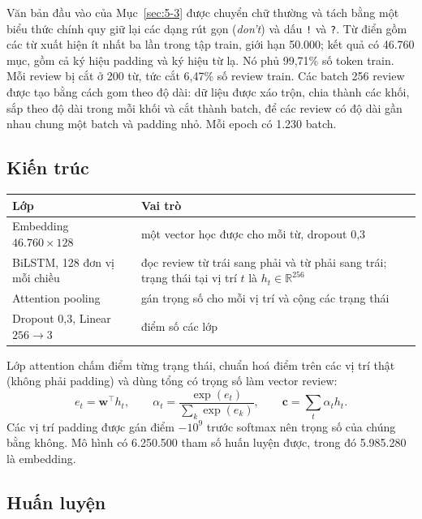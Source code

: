 Văn bản đầu vào của Mục~\ref{sec:5-3} được chuyển chữ thường và tách bằng một biểu thức chính quy giữ lại các dạng rút gọn (\emph{don't}) và dấu \texttt{!} và \texttt{?}. Từ điển gồm các từ xuất hiện ít nhất ba lần trong tập train, giới hạn 50.000; kết quả có 46.760 mục, gồm cả ký hiệu padding và ký hiệu từ lạ. Nó phủ 99,71\% số token train. Mỗi review bị cắt ở 200 từ, tức cắt 6,47\% số review train. Các batch 256 review được tạo bằng cách gom theo độ dài: dữ liệu được xáo trộn, chia thành các khối, sắp theo độ dài trong mỗi khối và cắt thành batch, để các review có độ dài gần nhau chung một batch và padding nhỏ. Mỗi epoch có 1.230 batch.

\subsection*{Kiến trúc}

\begin{center}
\begin{tabular}{@{}p{3.6cm}p{10.4cm}@{}}
    \toprule
    Lớp & Vai trò \\
    \midrule
    Embedding $46.760\times128$ & một vector học được cho mỗi từ, dropout 0,3 \\
    BiLSTM, 128 đơn vị mỗi chiều & đọc review từ trái sang phải và từ phải sang trái; trạng thái tại vị trí $t$ là $h_t\in\mathbb{R}^{256}$ \\
    Attention pooling & gán trọng số cho mỗi vị trí và cộng các trạng thái \\
    Dropout 0,3, Linear $256\to3$ & điểm số các lớp \\
    \bottomrule
\end{tabular}
\end{center}

Lớp attention chấm điểm từng trạng thái, chuẩn hoá điểm trên các vị trí thật (không phải padding) và dùng tổng có trọng số làm vector review:
\begin{equation*}
    e_t = \mathbf{w}^\top h_t,\qquad
    \alpha_t = \frac{\exp(e_t)}{\sum_k \exp(e_k)},\qquad
    \mathbf{c} = \sum_t \alpha_t h_t .
\end{equation*}
Các vị trí padding được gán điểm $-10^{9}$ trước softmax nên trọng số của chúng bằng không. Mô hình có 6.250.500 tham số huấn luyện được, trong đó 5.985.280 là embedding.

\subsection*{Huấn luyện}

